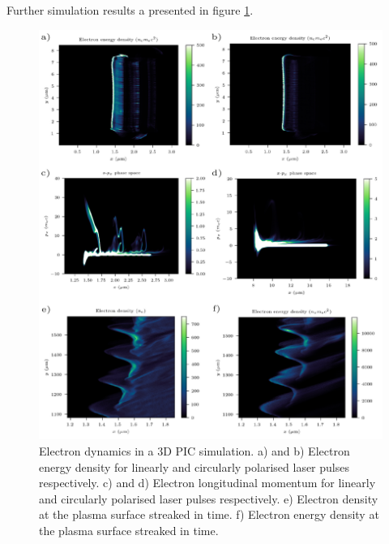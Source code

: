 Further simulation results a presented in figure \ref{fig:zvp3ddynamics}.
\begin{figure}
	\centering
	\includegraphics[width=1\linewidth]{figures/zvp/zvp_3D_dynamics}
	\caption[Electron dynamics in 3D PIC simulation for both linear and cirularly polarised relativistic laser pulses.]{Electron dynamics in a 3D PIC simulation. a) and b) Electron energy density for linearly and circularly polarised laser pulses respectively. c) and d) Electron longitudinal momentum for linearly and circularly polarised laser pulses respectively.  e) Electron density at the plasma surface streaked in time. f) Electron energy density at the plasma surface streaked in time.}
	\label{fig:zvp3ddynamics}
\end{figure}
